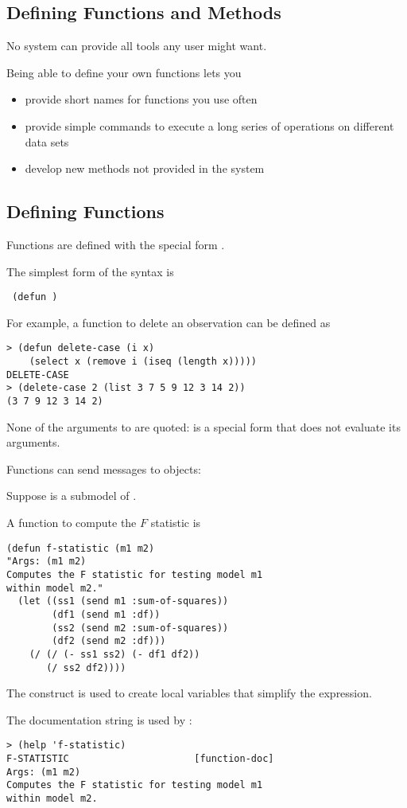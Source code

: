 \begin{slide}{}
\section{Defining Functions and Methods}
No system can provide all tools any user might want.

Being able to define your own functions lets you
\begin{itemize}
\item
provide short names for functions you use often
\item
provide simple commands to execute a long series of operations on
different data sets
\item
develop new methods not provided in the system
\end{itemize}
\end{slide}

\begin{slide}{}
\subsection{Defining Functions}
Functions are defined with the special form .

The simplest form of the  syntax is
\begin{flushleft}\Large\tt
(defun   )
\end{flushleft}
For example, a function to delete an observation can be defined as
{\Large
\begin{verbatim}
> (defun delete-case (i x)
    (select x (remove i (iseq (length x)))))
DELETE-CASE
> (delete-case 2 (list 3 7 5 9 12 3 14 2))
(3 7 9 12 3 14 2)
\end{verbatim}}
None of the arguments to  are quoted:  is a
special form that does not evaluate its arguments.
\end{slide}

\begin{slide}{}
Functions can send messages to objects:

Suppose  is a submodel of .

A function to compute the $F$ statistic is
{\Large
\begin{verbatim}
(defun f-statistic (m1 m2)
"Args: (m1 m2)
Computes the F statistic for testing model m1
within model m2."
  (let ((ss1 (send m1 :sum-of-squares))
        (df1 (send m1 :df))
        (ss2 (send m2 :sum-of-squares))
        (df2 (send m2 :df)))
    (/ (/ (- ss1 ss2) (- df1 df2))
       (/ ss2 df2))))
\end{verbatim}}
The  construct is used to create local variables that
simplify the expression.

The documentation string is used by :
{\Large
\begin{verbatim}
> (help 'f-statistic)
F-STATISTIC                      [function-doc]
Args: (m1 m2)
Computes the F statistic for testing model m1
within model m2.
\end{verbatim}}
\end{slide}


